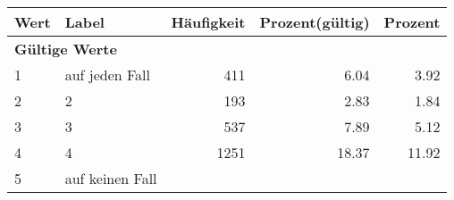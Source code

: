      \begin{longtable}{lXrrr}
     \toprule
     \textbf{Wert} & \textbf{Label} & \textbf{Häufigkeit} & \textbf{Prozent(gültig)} & \textbf{Prozent} \\
     \endhead
     \midrule
     \multicolumn{5}{l}{\textbf{Gültige Werte}}\\

     1 &
     \multicolumn{1}{X}{ auf jeden Fall   } &


       \num{411} &
       \num[round-mode=places,round-precision=2]{6,04} &
         \num[round-mode=places,round-precision=2]{3,92} \\

     2 &
     \multicolumn{1}{X}{ 2   } &


       \num{193} &
       \num[round-mode=places,round-precision=2]{2,83} &
         \num[round-mode=places,round-precision=2]{1,84} \\

     3 &
     \multicolumn{1}{X}{ 3   } &


       \num{537} &
       \num[round-mode=places,round-precision=2]{7,89} &
         \num[round-mode=places,round-precision=2]{5,12} \\

     4 &
     \multicolumn{1}{X}{ 4   } &


       \num{1251} &
       \num[round-mode=places,round-precision=2]{18,37} &
         \num[round-mode=places,round-precision=2]{11,92} \\

     5 &
     \multicolumn{1}{X}{ auf keinen Fall   } &



\end{longtable}
